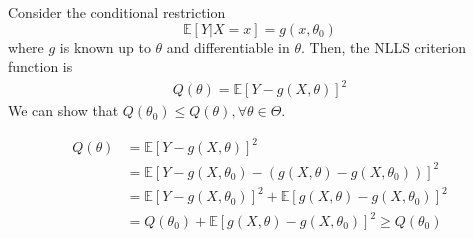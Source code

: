 \documentclass[11pt]{elegantbook}
\begin{document}
\begin{example}
    Consider the conditional restriction $$\mathbb{E}[Y|X=x]=g(x,\theta_0)$$
    where $g$ is known up to $\theta$ and differentiable in $\theta$. Then, the NLLS criterion function is
    \begin{equation}
        \begin{aligned}
            Q(\theta)=\mathbb{E}[Y-g(X,\theta)]^2
        \end{aligned}
        \nonumber
    \end{equation}
    We can show that $Q(\theta_0)\leq Q(\theta), \forall \theta\in \Theta$.
    \begin{lemma}
        \begin{equation}
            \begin{aligned}
                Q(\theta)&=\mathbb{E}[Y-g(X,\theta)]^2\\
                &=\mathbb{E}[Y-g(X,\theta_0)-(g(X,\theta)-g(X,\theta_0))]^2\\
                &=\mathbb{E}[Y-g(X,\theta_0)]^2+\mathbb{E}[g(X,\theta)-g(X,\theta_0)]^2\\
                &=Q(\theta_0)+\mathbb{E}[g(X,\theta)-g(X,\theta_0)]^2\geq Q(\theta_0)
            \end{aligned}
            \nonumber
        \end{equation}
    \end{lemma}
\end{example}
\end{document}
